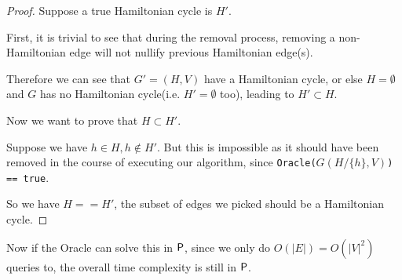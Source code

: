 \begin{proof}
Suppose a true Hamiltonian cycle is $H'$.

First, it is trivial to see that during the removal process, removing a non-Hamiltonian edge will not nullify previous Hamiltonian edge(s).

Therefore we can see that $G' = (H, V)$ have a Hamiltonian cycle, or else $H = \emptyset$ and $G$ has no Hamiltonian cycle(i.e. $H' = \emptyset$ too), leading to $H' \subset H$.

Now we want to prove that $H \subset H'$.

Suppose we have $h \in H, h \notin H'$. But this is impossible as it should have been removed in the course of executing our algorithm, since \texttt{Oracle($G(H / \{h\}, V)$) == true}.

So we have $H == H'$, the subset of edges we picked should be a Hamiltonian cycle.

\end{proof}

Now if the Oracle can solve this in $\P$, since we only do $O(|E|) = O(|V|^2)$ queries to, the overall time complexity is still in $\P$. 
